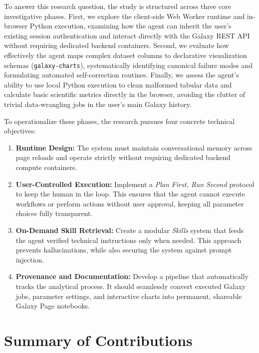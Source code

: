 To answer this research question, the study is structured across three core investigative phases. First, we explore the client-side Web Worker runtime and in-browser Python execution, examining how the agent can inherit the user's existing session authentication and interact directly with the Galaxy REST API without requiring dedicated backend containers. Second, we evaluate how effectively the agent maps complex dataset columns to declarative visualization schemas (\texttt{galaxy-charts}), systematically identifying canonical failure modes and formulating automated self-correction routines. Finally, we assess the agent's ability to use local Python execution to clean malformed tabular data and calculate basic scientific metrics directly in the browser, avoiding the clutter of trivial data-wrangling jobs in the user's main Galaxy history.

To operationalize these phases, the research pursues four concrete technical objectives:
\begin{enumerate}[\bfseries O1.]
    \item \textbf{Runtime Design:} The system must maintain conversational memory across page reloads and operate strictly without requiring dedicated backend compute containers.
    \item \textbf{User-Controlled Execution:} Implement a \textit{Plan First, Run Second} protocol to keep the human in the loop. This ensures that the agent cannot execute workflows or perform actions without user approval, keeping all parameter choices fully transparent.
    \item \textbf{On-Demand Skill Retrieval:} Create a modular \textit{Skills} system that feeds the agent verified technical instructions only when needed. This approach prevents hallucinations, while also securing the system against prompt injection.
    \item \textbf{Provenance and Documentation:} Develop a pipeline that automatically tracks the analytical process. It should seamlessly convert executed Galaxy jobs, parameter settings, and interactive charts into permanent, shareable Galaxy Page notebooks.
\end{enumerate}

\section{Summary of Contributions}
\label{sec:contributions}

